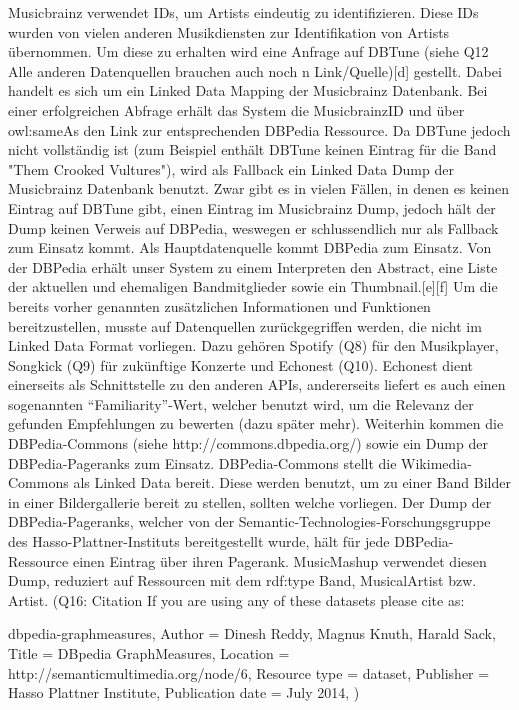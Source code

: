 Musicbrainz verwendet IDs, um Artists eindeutig zu identifizieren. Diese IDs wurden von vielen anderen Musikdiensten zur Identifikation von Artists übernommen. Um diese zu erhalten wird eine Anfrage auf DBTune (siehe Q12 Alle anderen Datenquellen brauchen auch noch n Link/Quelle)[d] gestellt. Dabei handelt es sich um ein Linked Data Mapping der Musicbrainz Datenbank. Bei einer erfolgreichen Abfrage erhält das System die MusicbrainzID und über owl:sameAs den Link zur entsprechenden DBPedia Ressource. Da DBTune jedoch nicht vollständig ist (zum Beispiel enthält DBTune keinen Eintrag für die Band "Them Crooked Vultures"), wird als Fallback ein Linked Data Dump der Musicbrainz Datenbank benutzt. Zwar gibt es in vielen Fällen, in denen es keinen Eintrag auf DBTune gibt, einen Eintrag im Musicbrainz Dump, jedoch hält der Dump keinen Verweis auf DBPedia, weswegen er schlussendlich nur als Fallback zum Einsatz kommt.
Als Hauptdatenquelle kommt DBPedia zum Einsatz. Von der DBPedia erhält unser System zu einem Interpreten den Abstract, eine Liste der aktuellen und ehemaligen Bandmitglieder sowie ein Thumbnail.[e][f]
Um die bereits vorher genannten zusätzlichen Informationen und Funktionen bereitzustellen, musste auf Datenquellen zurückgegriffen werden, die nicht im Linked Data Format vorliegen. Dazu gehören Spotify (Q8) für den Musikplayer, Songkick (Q9) für zukünftige Konzerte und Echonest (Q10). Echonest dient einerseits als Schnittstelle zu den anderen APIs, andererseits liefert es auch einen sogenannten “Familiarity”-Wert, welcher benutzt wird, um die Relevanz der gefunden Empfehlungen zu bewerten (dazu später mehr).
Weiterhin kommen die DBPedia-Commons (siehe http://commons.dbpedia.org/) sowie ein Dump der DBPedia-Pageranks zum Einsatz. DBPedia-Commons stellt die Wikimedia-Commons als Linked Data bereit. Diese werden benutzt, um zu einer Band Bilder in einer Bildergallerie bereit zu stellen, sollten welche vorliegen. 
Der Dump der DBPedia-Pageranks, welcher von der Semantic-Technologies-Forschungsgruppe des Hasso-Plattner-Instituts bereitgestellt wurde, hält für jede DBPedia-Ressource einen Eintrag über ihren Pagerank. MusicMashup verwendet diesen Dump, reduziert auf Ressourcen mit dem rdf:type Band, MusicalArtist bzw. Artist.
(Q16: Citation
If you are using any of these datasets please cite as:


{dbpedia-graphmeasures,
Author = {Dinesh Reddy, Magnus Knuth, Harald Sack},
Title = {DBpedia GraphMeasures},
Location = {http://semanticmultimedia.org/node/6},
Resource type = {dataset},
Publisher = {Hasso Plattner Institute},
Publication date = {July 2014},
})


